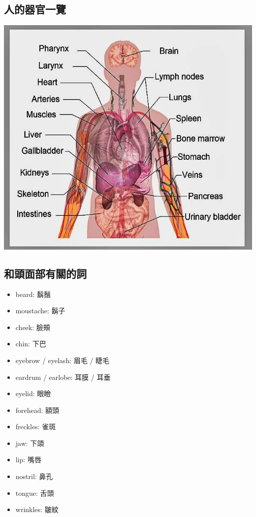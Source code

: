 \subsection{人的器官一覽}
\begin{center}
  \includegraphics[scale=0.4]{pics/in-body}
\end{center}

\subsection{和頭面部有關的詞}
\begin{multicols}{3}
\begin{itemize}
  \itemsep0em
  \item beard: 鬍鬚
  \item moustache: 鬍子
  \item cheek: 臉頰
  \item chin: 下巴
  \item eyebrow / eyelash: 眉毛 / 睫毛
  \item eardrum / earlobe: 耳膜 / 耳垂
  \item eyelid: 眼瞼
  \item forehead: 額頭
  \item freckles: 雀斑
  \item jaw: 下頜
  \item lip: 嘴唇
  \item nostril: 鼻孔
  \item tongue: 舌頭
  \item wrinkles: 皺紋
\end{itemize}
\end{multicols}

